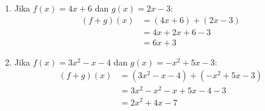 \begin{example}
  \hfill
  \begin{enumerate}
  \item Jika $f(x) = 4x + 6$ dan $g(x) = 2x - 3$:
    \[
    \begin{aligned}
      (f + g)(x) &= (4x + 6) + (2x - 3) \\
      &= 4x + 2x + 6 - 3 \\
      &= 6x + 3
    \end{aligned}
    \]
  \item Jika $f(x) = 3x^2 - x - 4$ dan $g(x) = -x^2 + 5x - 3$:
    \[
    \begin{aligned}
      (f + g)(x) &= (3x^2 - x - 4) + (-x^2 + 5x - 3) \\
      &= 3x^2 - x^2 - x + 5x - 4 - 3 \\
      &= 2x^2 + 4x - 7
    \end{aligned}
    \]
  \end{enumerate}
\end{example}
